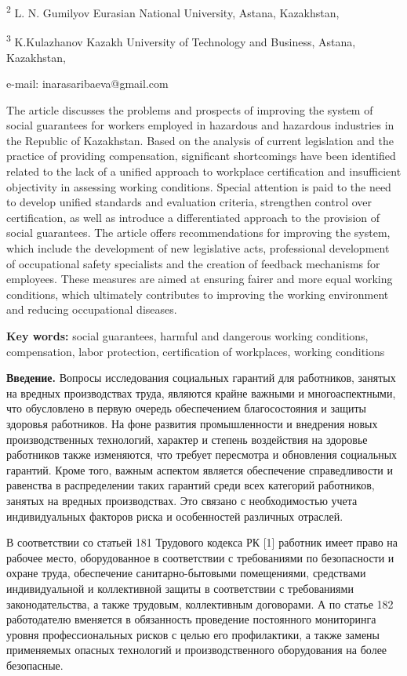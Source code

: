\textsuperscript{2} L. N. Gumilyov Eurasian National University, Astana,
Kazakhstan,

\textsuperscript{3} K.Kulazhanov Kazakh University of Technology and
Business, Astana, Kazakhstan,

e-mail: inarasaribaeva@gmail.com

The article discusses the problems and prospects of improving the system
of social guarantees for workers employed in hazardous and hazardous
industries in the Republic of Kazakhstan. Based on the analysis of
current legislation and the practice of providing compensation,
significant shortcomings have been identified related to the lack of a
unified approach to workplace certification and insufficient objectivity
in assessing working conditions. Special attention is paid to the need
to develop unified standards and evaluation criteria, strengthen control
over certification, as well as introduce a differentiated approach to
the provision of social guarantees. The article offers recommendations
for improving the system, which include the development of new
legislative acts, professional development of occupational safety
specialists and the creation of feedback mechanisms for employees. These
measures are aimed at ensuring fairer and more equal working conditions,
which ultimately contributes to improving the working environment and
reducing occupational diseases.

{\bfseries Key words:} social guarantees, harmful and dangerous working
conditions, compensation, labor protection, certification of workplaces,
working conditions

{\bfseries Введение.} Вопросы исследования социальных гарантий для
работников, занятых на вредных производствах труда, являются крайне
важными и многоаспектными, что обусловлено в первую очередь обеспечением
благосостояния и защиты здоровья работников. На фоне развития
промышленности и внедрения новых производственных технологий, характер и
степень воздействия на здоровье работников также изменяются, что требует
пересмотра и обновления социальных гарантий. Кроме того, важным аспектом
является обеспечение справедливости и равенства в распределении таких
гарантий среди всех категорий работников, занятых на вредных
производствах. Это связано с необходимостью учета индивидуальных
факторов риска и особенностей различных отраслей.

В соответствии со статьей 181 Трудового кодекса РК {[}1{]} работник
имеет право на рабочее место, оборудованное в соответствии с
требованиями по безопасности и охране труда, обеспечение
санитарно-бытовыми помещениями, средствами индивидуальной и коллективной
защиты в соответствии с требованиями законодательства, а также трудовым,
коллективным договорами. А по статье 182 работодателю вменяется в
обязанность проведение постоянного мониторинга уровня профессиональных
рисков с целью его профилактики, а также замены применяемых опасных
технологий и производственного оборудования на более безопасные.


